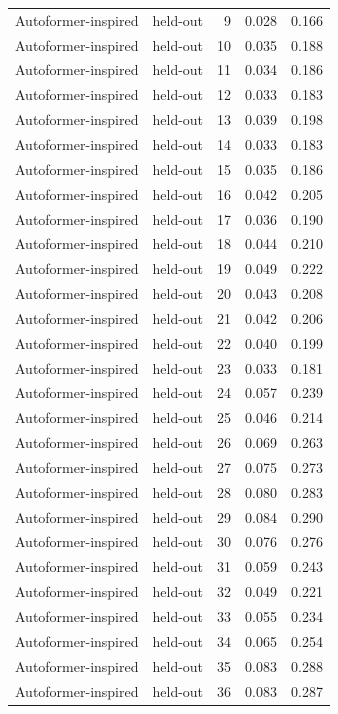 \begin{tabular}{llrrr}
Autoformer-inspired & held-out & 9 & 0.028 & 0.166 \\
Autoformer-inspired & held-out & 10 & 0.035 & 0.188 \\
Autoformer-inspired & held-out & 11 & 0.034 & 0.186 \\
Autoformer-inspired & held-out & 12 & 0.033 & 0.183 \\
Autoformer-inspired & held-out & 13 & 0.039 & 0.198 \\
Autoformer-inspired & held-out & 14 & 0.033 & 0.183 \\
Autoformer-inspired & held-out & 15 & 0.035 & 0.186 \\
Autoformer-inspired & held-out & 16 & 0.042 & 0.205 \\
Autoformer-inspired & held-out & 17 & 0.036 & 0.190 \\
Autoformer-inspired & held-out & 18 & 0.044 & 0.210 \\
Autoformer-inspired & held-out & 19 & 0.049 & 0.222 \\
Autoformer-inspired & held-out & 20 & 0.043 & 0.208 \\
Autoformer-inspired & held-out & 21 & 0.042 & 0.206 \\
Autoformer-inspired & held-out & 22 & 0.040 & 0.199 \\
Autoformer-inspired & held-out & 23 & 0.033 & 0.181 \\
Autoformer-inspired & held-out & 24 & 0.057 & 0.239 \\
Autoformer-inspired & held-out & 25 & 0.046 & 0.214 \\
Autoformer-inspired & held-out & 26 & 0.069 & 0.263 \\
Autoformer-inspired & held-out & 27 & 0.075 & 0.273 \\
Autoformer-inspired & held-out & 28 & 0.080 & 0.283 \\
Autoformer-inspired & held-out & 29 & 0.084 & 0.290 \\
Autoformer-inspired & held-out & 30 & 0.076 & 0.276 \\
Autoformer-inspired & held-out & 31 & 0.059 & 0.243 \\
Autoformer-inspired & held-out & 32 & 0.049 & 0.221 \\
Autoformer-inspired & held-out & 33 & 0.055 & 0.234 \\
Autoformer-inspired & held-out & 34 & 0.065 & 0.254 \\
Autoformer-inspired & held-out & 35 & 0.083 & 0.288 \\
Autoformer-inspired & held-out & 36 & 0.083 & 0.287 \\

\end{tabular}
